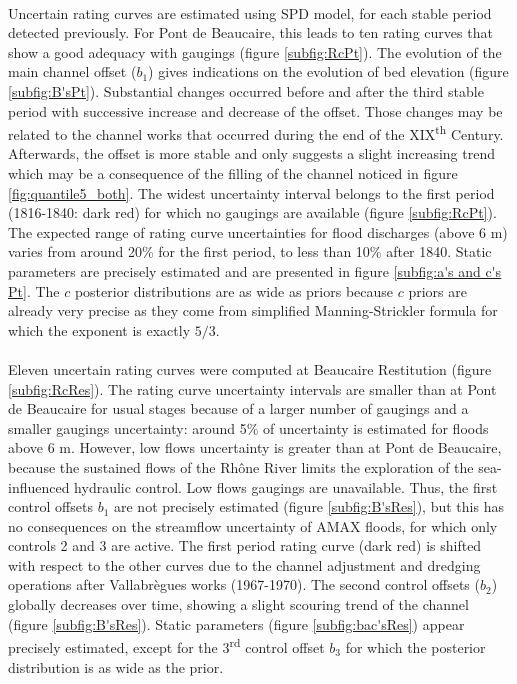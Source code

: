     \paragraph{}
    Uncertain rating curves are estimated using \citet{mansanarez_shift_2019} SPD model, for each stable period detected previously. For Pont de Beaucaire, this leads to ten rating curves that show a good adequacy with gaugings (figure \ref{subfig:RcPt}). The evolution of the main channel offset ($b_1$) gives indications on the evolution of bed elevation (figure \ref{subfig:B'sPt}). Substantial changes occurred before and after the third stable period with successive increase and decrease of the offset. Those changes may be related to the channel works that occurred during the end of the XIX\textsuperscript{th} Century. Afterwards, the offset is more stable and only suggests a slight increasing trend which may be a consequence of the filling of the channel noticed in figure \ref{fig:quantile5_both}. The widest uncertainty interval belongs to the first period (1816-1840: dark red) for which no gaugings are available (figure \ref{subfig:RcPt}). The expected range of rating curve uncertainties for flood discharges (above 6 m) varies from around 20\% for the first period, to less than 10\% after 1840. Static parameters are precisely estimated and are presented in figure \ref{subfig:a's and c's Pt}. The $c$ posterior distributions are as wide as priors because $c$ priors are already very precise as they come from simplified Manning-Strickler formula for which the exponent is exactly $5/3$.
    
    \paragraph{}
    Eleven uncertain rating curves were computed at Beaucaire Restitution (figure \ref{subfig:RcRes}). The rating curve uncertainty intervals are smaller than at Pont de Beaucaire for usual stages because of a larger number of gaugings and a smaller gaugings uncertainty: around 5\% of uncertainty is estimated for floods above 6 m. However, low flows uncertainty is greater than at Pont de Beaucaire, because the sustained flows of the Rhône River limits the exploration of the sea-influenced hydraulic control. Low flows gaugings are unavailable. Thus, the first control offsets $b_1$ are not precisely estimated (figure \ref{subfig:B'sRes}), but this has no consequences on the streamflow uncertainty of AMAX floods, for which only controls 2 and 3 are active. The first period rating curve (dark red) is shifted with respect to the other curves due to the channel adjustment and dredging operations after Vallabrègues works (1967-1970). The second control offsets ($b_2$) globally decreases over time, showing a slight scouring trend of the channel (figure \ref{subfig:B'sRes}). Static parameters (figure \ref{subfig:bac'sRes}) appear precisely estimated, except for the 3\textsuperscript{rd} control offset $b_3$ for which the posterior distribution is as wide as the prior. 
    
